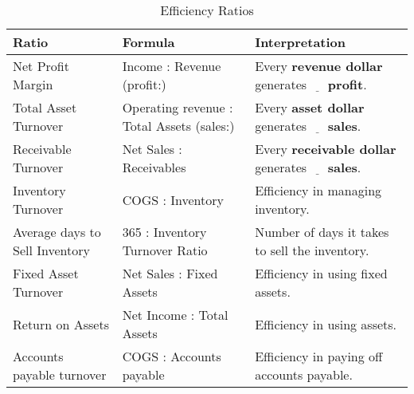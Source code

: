 \begin{table}[h]
    \centering
    \caption{Efficiency Ratios}
    \label{tab:other_financial_ratios}
    \begin{tabular}{|p{}|p{}|p{}|}
        \hline
        \textbf{Ratio}                 & \textbf{Formula}                                              & \textbf{Interpretation}                                                               \\
        \hline
        Net Profit Margin              & Income : Revenue (profit:)                                    & Every \textbf{revenue dollar} generates $\underline{\hspace{1em}}$ \textbf{profit}.   \\
        \hline
        Total Asset Turnover           & Operating revenue : Total Assets (sales:)                     & Every \textbf{asset dollar} generates $\underline{\hspace{1em}}$ \textbf{sales}.      \\
        \hline
        Receivable Turnover            & Net Sales : Receivables                                       & Every \textbf{receivable dollar} generates $\underline{\hspace{1em}}$ \textbf{sales}. \\
        \hline
        Inventory Turnover             & COGS : Inventory                                              & Efficiency in managing inventory.                                                     \\
        \hline
        Average days to Sell Inventory & 365 : Inventory Turnover Ratio                                & Number of days it takes to sell the inventory.                                        \\
        \hline
        Fixed Asset Turnover           & Net Sales : Fixed Assets                                      & Efficiency in using fixed assets.                                                     \\
        \hline
        Return on Assets               & Net Income : Total Assets                                     & Efficiency in using assets.                                                           \\
        \hline
        Accounts payable turnover      & COGS : Accounts payable                                       & Efficiency in paying off accounts payable.                                            \\

\end{tabular}
\end{table}
